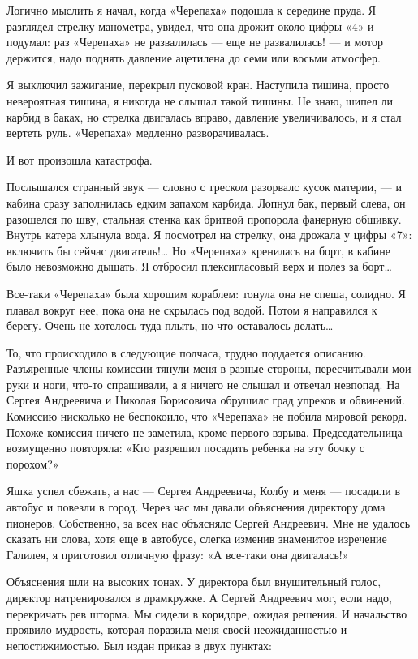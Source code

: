 Логично мыслить  я начал,  когда «Черепаха»  подошла к  середине пруда.  Я
разглядел стрелку  манометра, увидел,  что она  дрожит около  цифры «4»  и
подумал: раз «Черепаха»  не развалилась —  еще не развалилась!  — и  мотор
держится, надо поднять давление ацетилена до семи или восьми атмосфер.

Я выключил  зажигание, перекрыл  пусковой кран.  Наступила тишина,  просто
невероятная тишина, я никогда  не слышал такой тишины.  Не знаю, шипел  ли
карбид в баках, но стрелка  двигалась вправо, давление увеличивалось, и  я
стал вертеть руль. «Черепаха» медленно разворачивалась.

И вот произошла катастрофа.

Послышался странный звук — словно с  треском разорвалс кусок материи, —  и
кабина сразу заполнилась едким запахом карбида. Лопнул бак, первый  слева,
он разошелся  по  шву,  стальная стенка  как  бритвой  пропорола  фанерную
обшивку. Внутрь катера хлынула вода. Я посмотрел на стрелку, она дрожала у
цифры «7»: включить бы сейчас двигатель!… Но «Черепаха» кренилась на борт,
в кабине было невозможно дышать. Я отбросил плексигласовый верх и полез за
борт…

Все-таки «Черепаха» была хорошим кораблем: тонула она не спеша, солидно. Я
плавал вокруг нее, пока  она не скрылась под  водой. Потом я направился  к
берегу. Очень не хотелось туда плыть, но что оставалось делать…

То, что  происходило  в  следующие  полчаса,  трудно  поддается  описанию.
Разъяренные члены комиссии тянули меня в разные стороны, пересчитывали мои
руки и ноги, что-то спрашивали, а  я ничего не слышал и отвечал  невпопад.
На  Сергея  Андреевича  и  Николая  Борисовича  обрушилс  град  упреков  и
обвинений. Комиссию  нисколько не  беспокоило,  что «Черепаха»  не  побила
мировой рекорд. Похоже комиссия ничего не заметила, кроме первого  взрыва.
Председательница возмущенно повторяла: «Кто  разрешил посадить ребенка  на
эту бочку с порохом?»

Яшка успел сбежать, а нас — Сергея  Андреевича, Колбу и меня — посадили  в
автобус и повезли в город. Через  час мы давали объяснения директору  дома
пионеров. Собственно,  за  всех нас  объяснялс  Сергей Андреевич.  Мне  не
удалось сказать ни слова, хотя  еще в автобусе, слегка изменив  знаменитое
изречение  Галилея,  я   приготовил  отличную  фразу:   «А  все-таки   она
двигалась!»

Объяснения шли  на  высоких тонах.  У  директора был  внушительный  голос,
директор натренировался в драмкружке. А  Сергей Андреевич мог, если  надо,
перекричать рев шторма. Мы сидели в коридоре, ожидая решения. И начальство
проявило  мудрость,   которая  поразила   меня  своей   неожиданностью   и
непостижимостью. Был издан приказ в двух пунктах:


